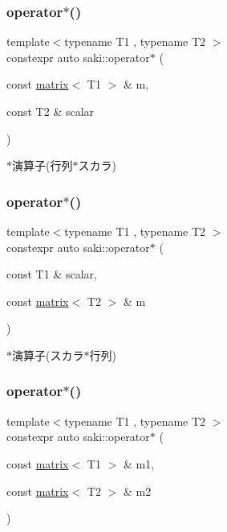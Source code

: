 \subsubsection{\texorpdfstring{operator$\ast$()}{operator*()}\hspace{0.1cm}{\footnotesize\ttfamily [12/14]}}
{\footnotesize\ttfamily template$<$typename T1 , typename T2 $>$ \\
constexpr auto saki\+::operator$\ast$ (\begin{DoxyParamCaption}\item[{const \mbox{\hyperlink{classsaki_1_1matrix}{matrix}}$<$ T1 $>$ \&}]{m,  }\item[{const T2 \&}]{scalar }\end{DoxyParamCaption})}



$\ast$演算子(行列$\ast$スカラ) 

\mbox{\label{namespacesaki_acc7d16324180fd378c3636f9bd961d20}} 
\subsubsection{\texorpdfstring{operator$\ast$()}{operator*()}\hspace{0.1cm}{\footnotesize\ttfamily [13/14]}}
{\footnotesize\ttfamily template$<$typename T1 , typename T2 $>$ \\
constexpr auto saki\+::operator$\ast$ (\begin{DoxyParamCaption}\item[{const T1 \&}]{scalar,  }\item[{const \mbox{\hyperlink{classsaki_1_1matrix}{matrix}}$<$ T2 $>$ \&}]{m }\end{DoxyParamCaption})}



$\ast$演算子(スカラ$\ast$行列) 

\mbox{\label{namespacesaki_ae7d9d53f473cbaa176e97500ea9ee491}} 
\subsubsection{\texorpdfstring{operator$\ast$()}{operator*()}\hspace{0.1cm}{\footnotesize\ttfamily [14/14]}}
{\footnotesize\ttfamily template$<$typename T1 , typename T2 $>$ \\
constexpr auto saki\+::operator$\ast$ (\begin{DoxyParamCaption}\item[{const \mbox{\hyperlink{classsaki_1_1matrix}{matrix}}$<$ T1 $>$ \&}]{m1,  }\item[{const \mbox{\hyperlink{classsaki_1_1matrix}{matrix}}$<$ T2 $>$ \&}]{m2 }\end{DoxyParamCaption})}



